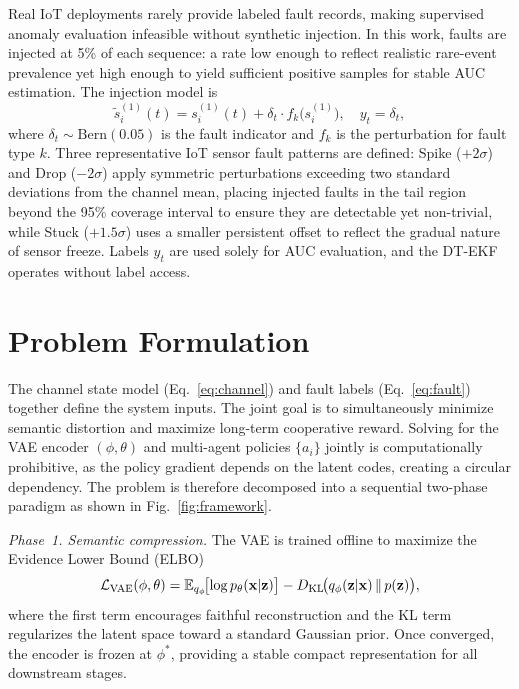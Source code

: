 \documentclass[conference]{IEEEtran}
\begin{document}
Real IoT deployments rarely provide labeled fault records, making supervised anomaly evaluation infeasible without synthetic injection. In this work, faults are injected at 5\% of each sequence: a rate low enough to reflect realistic rare-event prevalence yet high enough to yield sufficient positive samples for stable AUC estimation. The injection model is
\begin{equation}
\tilde{s}^{(1)}_i(t) = s^{(1)}_i(t) + \delta_t \cdot f_k\!\bigl(s^{(1)}_i\bigr), \quad y_t = \delta_t,
\label{eq:fault}
\end{equation}
where $\delta_t\!\sim\!\mathrm{Bern}(0.05)$ is the fault indicator and $f_k$ is the perturbation for fault type $k$. Three representative IoT sensor fault patterns are defined: Spike ($+2\sigma$) and Drop ($-2\sigma$) apply symmetric perturbations exceeding two standard deviations from the channel mean, placing injected faults in the tail region beyond the 95\% coverage interval to ensure they are detectable yet non-trivial, while Stuck ($+1.5\sigma$) uses a smaller persistent offset to reflect the gradual nature of sensor freeze. Labels $y_t$ are used solely for AUC evaluation, and the DT-EKF operates without label access.

\vspace{-5pt}
\section{Problem Formulation}
\label{sec:problem}

The channel state model (Eq.~\ref{eq:channel}) and fault labels (Eq.~\ref{eq:fault}) together define the system inputs. The joint goal is to simultaneously minimize semantic distortion and maximize long-term cooperative reward. Solving for the VAE encoder $(\phi,\theta)$ and multi-agent policies $\{a_i\}$ jointly is computationally prohibitive, as the policy gradient depends on the latent codes, creating a circular dependency. The problem is therefore decomposed into a sequential two-phase paradigm as shown in Fig.~\ref{fig:framework}.

\textit{Phase~1. Semantic compression.}
The VAE is trained offline to maximize the Evidence Lower Bound (ELBO)~\cite{ref_vae}
\begin{equation}
\mathcal{L}_{\rm VAE}(\phi,\theta)=
  \mathbb{E}_{q_\phi}\!\bigl[\log p_\theta(\mathbf{x}|\mathbf{z})\bigr]
  - D_{\rm KL}\!\bigl(q_\phi(\mathbf{z}|\mathbf{x})\,\|\,p(\mathbf{z})\bigr),
\label{eq:elbo}
\end{equation}
where the first term encourages faithful reconstruction and the KL term regularizes the latent space toward a standard Gaussian prior. Once converged, the encoder is frozen at $\phi^*$, providing a stable compact representation for all downstream stages.
\end{document}
